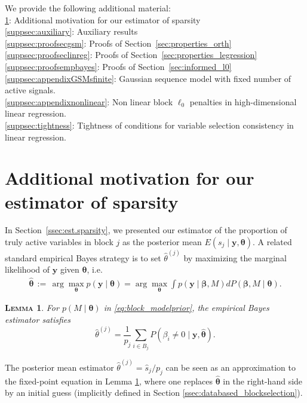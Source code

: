 \documentclass[bj,authoryear]{imsart}
\theoremstyle{plain}
\newtheorem{lem}[thm]{\textsc{Lemma}}
\newcommand{\bs}{\boldsymbol}
\begin{document}
We provide the following additional material:\\
\noindent\ref{suppsec:ebayes}: Additional motivation for our estimator of sparsity\\
\ref{suppsec:auxiliary}: Auxiliary results\\
\ref{suppsec:proofsecgsm}: Proofs of Section~\ref{sec:properties_orth}\\
\ref{suppsec:proofseclinreg}: Proofs of Section~\ref{sec:properties_legression}\\
\ref{suppsec:proofsempbayes}: Proofs of Section~\ref{sec:informed_l0}\\
\ref{suppsec:appendixGSMsfinite}: Gaussian sequence model with fixed number of active signals.\\
\ref{suppsec:appendixnonlinear}: Non linear block $\ell_0$ penalties in high-dimensional linear regression.\\
\ref{suppsec:tightness}: Tightness of conditions for variable selection consistency in linear regression.

\section{Additional motivation for our estimator of sparsity}\label{suppsec:ebayes} In Section~\ref{ssec:est.sparsity}, we presented our estimator of the proportion of truly active variables in block $j$ as the posterior mean $E(s_j \mid \bs y,\bs \theta)$. A related standard empirical Bayes strategy is to set $\hat{\theta}^{(j)}$ by %
maximizing the marginal likelihood of $\bs y$ given $\bs \theta$, i.e.
\begin{eqnarray}
\hat{\bs \theta}
\,:=\, \arg\max_{\bs \theta} p(\bs y \mid \bs \theta)=
\arg\max_{\bs \theta} \int p(\bs y \mid \bs \beta, M) d P(\bs \beta, M \mid \bs \theta).
\nonumber
\end{eqnarray}
\begin{lem}\label{lem:empiricalbayesinterpret} For $p(M \mid \bs \theta)$ in \eqref{eq:block_modelprior}, the empirical Bayes estimator satisfies 
$$\hat{\theta}^{(j)} = \frac{1}{p_j}\sum_{i\in B_j}P(\beta_i \neq 0 \mid \bs y,\hat{\bs \theta}).$$
\end{lem}
The posterior mean estimator $\hat{\theta}^{(j)}=\widehat{s}_j/p_j$ can be seen as an approximation to the fixed-point equation in Lemma \ref{lem:empiricalbayesinterpret}, where one replaces $\hat{\bs \theta}$ in the right-hand side by an initial guess (implicitly defined in Section \ref{ssec:databased_blockselection}). 
\end{document}
